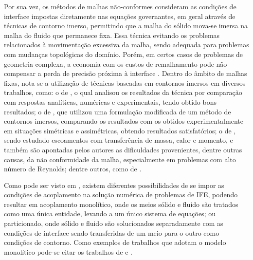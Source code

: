 Por sua vez, os métodos de malhas não-conformes consideram as condições de interface impostas diretamente nas equações governantes, em geral através de técnicas de contorno imerso, permitindo que a malha do sólido mova-se imersa na malha do fluido que permanece fixa. Essa técnica evitando os problemas relacionados à movimentação excessiva da malha, sendo adequada para problemas com mudanças topológicas do domínio. Porém, em certos casos de problemas de geometria complexa, a economia com os custos de remalhamento pode não compensar a perda de precisão próxima à interface \cite{bazilevs2013computational,hou2012numerical,bazilevs2015ale}. Dentro do âmbito de malhas fixas, nota-se a utilização de técnicas baseadas em contornos imersos em diversos trabalhos, como: o de , o qual analisou os resultados da técnica por comparação com respostas analíticas, numéricas e experimentais, tendo obtido bons resultados; o de , que utilizou uma formulação modificada de um método de contornos imersos, comparando os resultados com os obtidos experimentalmente em situações simétricas e assimétricas, obtendo resultados satisfatórios; o de , sendo estudado escoamentos com transferência de massa, calor e momento, e também são apontadas pelos autores as dificuldades provenientes, dentre outras causas, da não conformidade da malha, especialmente em problemas com alto número de Reynolds; dentre outros, como de .

Como pode ser visto em , existem diferentes possibilidades de se impor as condições de acoplamento na solução numérica de problemas de IFE, podendo resultar em acoplamento monolítico, onde os meios sólido e fluido são tratados como uma única entidade, levando a um único sistema de equações; ou particionado, onde sólido e fluido são solucionados separadamente com as condições de interface sendo transferidas de um meio para o outro como condições de contorno. Como exemplos de trabalhos que adotam o modelo monolítico pode-se citar os trabalhos de  e .

